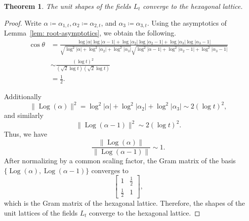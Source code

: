 \documentclass[11pt]{amsart}
\numberwithin{equation}{section}
\newtheorem{theorem}[algorithm]{Theorem}
\theoremstyle{definition}
\DeclareMathOperator{\Log}{Log}
\begin{document}
\begin{theorem}
\label{thm: shapes-convergence}
    The unit shapes of the fields $L_t$ converge to the hexagonal lattice.
\end{theorem}
\begin{proof}
     Write $\alpha\coloneqq\alpha_{1,t}, \alpha_2 \coloneqq \alpha_{2,t}$, and $\alpha_3 \coloneqq  \alpha_{3,t}$. Using the asymptotics of Lemma~\ref{lem: root-asymptotics}, we obtain the following. 
    \begin{align*}
           \cos \theta  
           &= \frac{\log|\alpha|\log|\alpha -1| + \log|\alpha_2|\log|\alpha_2-1|+ \log|\alpha_3|\log|\alpha_3-1|}{\sqrt{\log^2|\alpha| + \log^2|\alpha_2| + \log^2|\alpha_3|}\sqrt{\log^2|\alpha-1| + \log^2|\alpha_2-1| + \log^2|\alpha_3-1|} } \\
           &\sim \frac{(\log t)^2}{(\sqrt{2}\log t)(\sqrt{2}\log t)}\\
           & = \frac{1}{2}.       
    \end{align*}

Additionally
    \[
        \|\Log(\alpha)\|^2 = \log^2|\alpha| + \log^2|\alpha_2| + \log^2|\alpha_3| \sim 2(\log t)^2,
    \]
and similarly
    \[
        \|\Log(\alpha-1)\|^2 \sim 2(\log t)^2.
    \]
Thus, we have
    \[
        \frac{\|\Log(\alpha)\|}{\|\Log(\alpha-1)\|} \sim 1.
    \]
After normalizing by a common scaling factor, the Gram matrix of the basis $\{\Log(\alpha),\Log(\alpha-1)\}$ converges to
    \[
        \begin{bmatrix}
        1 & \frac12\\
        \frac12 & 1
        \end{bmatrix},
    \]
which is the Gram matrix of the hexagonal lattice. Therefore, the shapes of the unit lattices of the fields $L_t$ converge to the hexagonal lattice.   
\end{proof}







\begingroup
\hypersetup{
  urlcolor=mybiburlcolor
}
{} 
\endgroup
\end{document}
